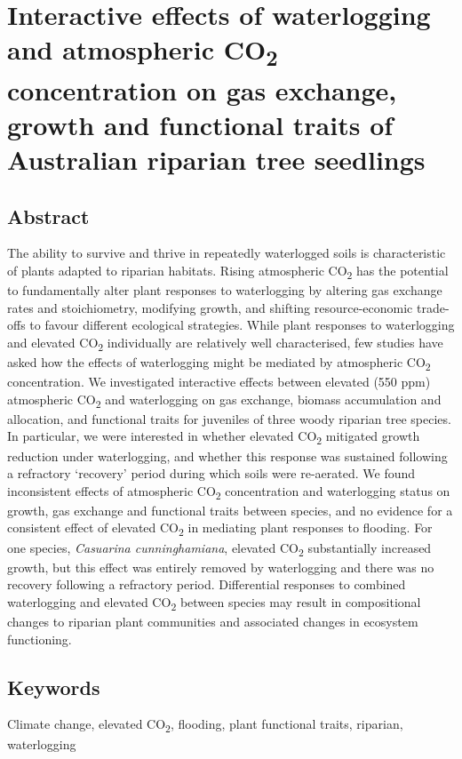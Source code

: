 \documentclass[openright,12pt,a4paper]{memoir}
\begin{document}
\onehalfspacing


\chapter[glasshouse]{Interactive effects of waterlogging and atmospheric CO\textsubscript{2} concentration on gas exchange, growth and functional traits of Australian riparian tree seedlings}
\newpage

\section*{Abstract}
The ability to survive and thrive in repeatedly waterlogged soils is characteristic of plants adapted to riparian habitats. Rising atmospheric CO\textsubscript{2} has the potential to fundamentally alter plant responses to waterlogging by altering gas exchange rates and stoichiometry, modifying growth, and shifting resource-economic trade-offs to favour different ecological strategies. While plant responses to waterlogging and elevated CO\textsubscript{2} individually are relatively well characterised, few studies have asked how the effects of waterlogging might be mediated by atmospheric CO\textsubscript{2} concentration. We investigated interactive effects between elevated (550 ppm) atmospheric CO\textsubscript{2} and waterlogging on gas exchange, biomass accumulation and allocation, and functional traits for juveniles of three woody riparian tree species. In particular, we were interested in whether elevated CO\textsubscript{2} mitigated growth reduction under waterlogging, and whether this response was sustained following a refractory ‘recovery’ period during which soils were re-aerated. We found inconsistent effects of atmospheric CO\textsubscript{2} concentration and waterlogging status on growth, gas exchange and functional traits between species, and no evidence for a consistent effect of elevated CO\textsubscript{2} in mediating plant responses to flooding. For one species, \textit{Casuarina cunninghamiana}, elevated CO\textsubscript{2} substantially increased growth, but this effect was entirely removed by waterlogging and there was no recovery following a refractory period. Differential responses to combined waterlogging and elevated CO\textsubscript{2} between species may result in compositional changes to riparian plant communities and associated changes in ecosystem functioning.

\section*{Keywords}
Climate change, elevated CO\textsubscript{2}, flooding, plant functional traits, riparian, waterlogging
\end{document}
